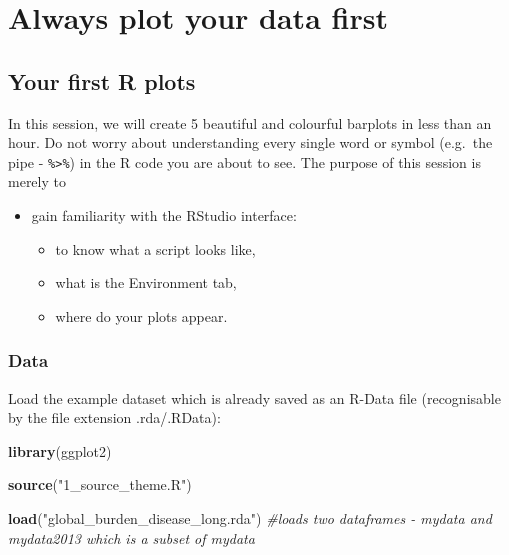 \documentclass[]{book}
\makeatletter
\newenvironment{Shaded}{\begin{snugshade}}{\end{snugshade}}
\newcommand{\CommentTok}[1]{\textcolor[rgb]{0.56,0.35,0.01}{\textit{#1}}}
\newcommand{\KeywordTok}[1]{\textcolor[rgb]{0.13,0.29,0.53}{\textbf{#1}}}
\newcommand{\NormalTok}[1]{#1}
\newcommand{\StringTok}[1]{\textcolor[rgb]{0.31,0.60,0.02}{#1}}
\providecommand{\tightlist}{%
  \setlength{\itemsep}{0pt}\setlength{\parskip}{0pt}}
\newenvironment{kframe}{%
\medskip{}
\setlength{\fboxsep}{.8em}
 \def\at@end@of@kframe{}%
 \ifinner\ifhmode%
  \def\at@end@of@kframe{\end{minipage}}%
  \begin{minipage}{\columnwidth}%
 \fi\fi%
 \def\FrameCommand##1{\hskip\@totalleftmargin \hskip-\fboxsep
 \colorbox{shadecolor}{##1}\hskip-\fboxsep
     \hskip-\linewidth \hskip-\@totalleftmargin \hskip\columnwidth}%
 \MakeFramed {\advance\hsize-\width
   \@totalleftmargin\z@ \linewidth\hsize
   \@setminipage}}%
 {\par\unskip\endMakeFramed%
 \at@end@of@kframe}
\renewenvironment{Shaded}{\begin{kframe}}{\end{kframe}}
\theoremstyle{definition}
\theoremstyle{definition}
\theoremstyle{definition}
\theoremstyle{remark}
\makeatother
\begin{document}
\hypertarget{part-always-plot-your-data-first}{%
\part{Always plot your data
first}\label{part-always-plot-your-data-first}}

\hypertarget{your-first-r-plots}{%
\chapter{Your first R plots}\label{your-first-r-plots}}

In this session, we will create 5 beautiful and colourful barplots in
less than an hour. Do not worry about understanding every single word or
symbol (e.g.~the pipe - \texttt{\%\textgreater{}\%}) in the R code you
are about to see. The purpose of this session is merely to

\begin{itemize}
\tightlist
\item
  gain familiarity with the RStudio interface:

  \begin{itemize}
  \tightlist
  \item
    to know what a script looks like,
  \item
    what is the Environment tab,
  \item
    where do your plots appear.
  \end{itemize}
\end{itemize}

\hypertarget{data}{%
\section{Data}\label{data}}

Load the example dataset which is already saved as an R-Data file
(recognisable by the file extension .rda/.RData):

\begin{Shaded}
\begin{Highlighting}[]
\KeywordTok{library}\NormalTok{(ggplot2)}

\KeywordTok{source}\NormalTok{(}\StringTok{"1_source_theme.R"}\NormalTok{)}

\KeywordTok{load}\NormalTok{(}\StringTok{"global_burden_disease_long.rda"}\NormalTok{)}
\CommentTok{#loads two dataframes - mydata and mydata2013 which is a subset of mydata}
\end{Highlighting}
\end{Shaded}
\end{document}
